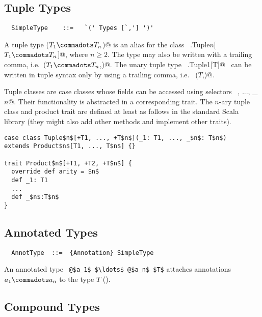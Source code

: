 
\subsection{Tuple Types}\label{sec:tuple-types}

\syntax\begin{lstlisting}
  SimpleType    ::=   `(' Types [`,'] ')'
\end{lstlisting}

A tuple type \lstinline@($T_1 \commadots T_n$)@ is an alias for the
class ~\lstinline@scala.Tuple$n$[$T_1 \commadots T_n$]@, where $n \geq
2$.  The type may also be written with a trailing comma, i.e.\
\lstinline@($T_1 \commadots T_n$,)@.  The unary tuple type
~\lstinline@scala.Tuple1[T]@~ can be written in tuple syntax only by
using a trailing comma, i.e. ~\lstinline@($T$,)@. 

Tuple classes are case classes whose fields can be accessed using
selectors ~\code{_1}, ..., \lstinline@_$n$@. Their functionality is
abstracted in a corresponding \code{Product} trait. The $n$-ary tuple
class and product trait are defined at least as follows in the
standard Scala library (they might also add other methods and
implement other traits).

\begin{lstlisting}
case class Tuple$n$[+T1, ..., +T$n$](_1: T1, ..., _$n$: T$n$) 
extends Product$n$[T1, ..., T$n$] {}

trait Product$n$[+T1, +T2, +T$n$] {
  override def arity = $n$
  def _1: T1
  ...
  def _$n$:T$n$
}
\end{lstlisting}

\subsection{Annotated Types}

\syntax\begin{lstlisting}
  AnnotType  ::=  {Annotation} SimpleType
\end{lstlisting}

An annotated type ~\lstinline^@$a_1$ $\ldots$ @$a_n$ $T$^
attaches annotations $a_1 \commadots a_n$ to the type $T$
().

\subsection{Compound Types}
\label{sec:compound-types}
\label{sec:refinements}

